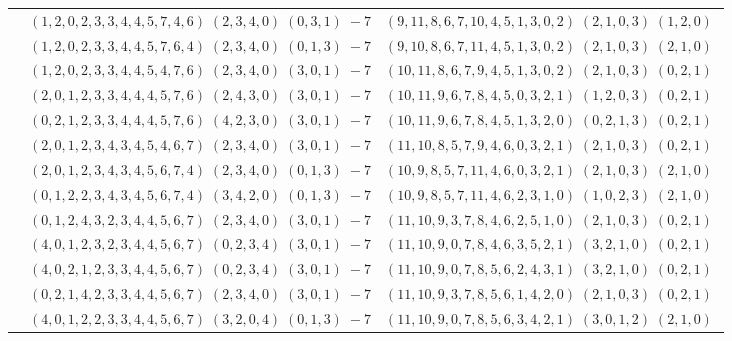\documentclass[11pt]{article}
\begin{document}
\begin{longtable}[l]{|c|c|c|}
 \cline{2-3} 
 & $(1 ,2 ,0 ,2 ,3 ,3 ,4 ,4 ,5 ,7 ,4 ,6) \;(2 ,3 ,4 ,0) \;(0 ,3 ,1) \;-7$ & $(9 ,11 ,8 ,6 ,7 ,10 ,4 ,5 ,1 ,3 ,0 ,2) \;(2 ,1 ,0 ,3) \;(1 ,2 ,0) \;$\\ 
 \cline{2-3} 
 & $(1 ,2 ,0 ,2 ,3 ,3 ,4 ,4 ,5 ,7 ,6 ,4) \;(2 ,3 ,4 ,0) \;(0 ,1 ,3) \;-7$ & $(9 ,10 ,8 ,6 ,7 ,11 ,4 ,5 ,1 ,3 ,0 ,2) \;(2 ,1 ,0 ,3) \;(2 ,1 ,0) \;$\\ 
 \cline{2-3} 
 & $(1 ,2 ,0 ,2 ,3 ,3 ,4 ,4 ,5 ,4 ,7 ,6) \;(2 ,3 ,4 ,0) \;(3 ,0 ,1) \;-7$ & $(10 ,11 ,8 ,6 ,7 ,9 ,4 ,5 ,1 ,3 ,0 ,2) \;(2 ,1 ,0 ,3) \;(0 ,2 ,1) \;$\\ 
 \cline{2-3} 
 & $(2 ,0 ,1 ,2 ,3 ,3 ,4 ,4 ,4 ,5 ,7 ,6) \;(2 ,4 ,3 ,0) \;(3 ,0 ,1) \;-7$ & $(10 ,11 ,9 ,6 ,7 ,8 ,4 ,5 ,0 ,3 ,2 ,1) \;(1 ,2 ,0 ,3) \;(0 ,2 ,1) \;$\\ 
 \cline{2-3} 
 & $(0 ,2 ,1 ,2 ,3 ,3 ,4 ,4 ,4 ,5 ,7 ,6) \;(4 ,2 ,3 ,0) \;(3 ,0 ,1) \;-7$ & $(10 ,11 ,9 ,6 ,7 ,8 ,4 ,5 ,1 ,3 ,2 ,0) \;(0 ,2 ,1 ,3) \;(0 ,2 ,1) \;$\\ 
 \cline{2-3} 
 & $(2 ,0 ,1 ,2 ,3 ,4 ,3 ,4 ,5 ,4 ,6 ,7) \;(2 ,3 ,4 ,0) \;(3 ,0 ,1) \;-7$ & $(11 ,10 ,8 ,5 ,7 ,9 ,4 ,6 ,0 ,3 ,2 ,1) \;(2 ,1 ,0 ,3) \;(0 ,2 ,1) \;$\\ 
 \cline{2-3} 
 & $(2 ,0 ,1 ,2 ,3 ,4 ,3 ,4 ,5 ,6 ,7 ,4) \;(2 ,3 ,4 ,0) \;(0 ,1 ,3) \;-7$ & $(10 ,9 ,8 ,5 ,7 ,11 ,4 ,6 ,0 ,3 ,2 ,1) \;(2 ,1 ,0 ,3) \;(2 ,1 ,0) \;$\\ 
 \cline{2-3} 
 & $(0 ,1 ,2 ,2 ,3 ,4 ,3 ,4 ,5 ,6 ,7 ,4) \;(3 ,4 ,2 ,0) \;(0 ,1 ,3) \;-7$ & $(10 ,9 ,8 ,5 ,7 ,11 ,4 ,6 ,2 ,3 ,1 ,0) \;(1 ,0 ,2 ,3) \;(2 ,1 ,0) \;$\\ 
 \cline{2-3} 
 & $(0 ,1 ,2 ,4 ,3 ,2 ,3 ,4 ,4 ,5 ,6 ,7) \;(2 ,3 ,4 ,0) \;(3 ,0 ,1) \;-7$ & $(11 ,10 ,9 ,3 ,7 ,8 ,4 ,6 ,2 ,5 ,1 ,0) \;(2 ,1 ,0 ,3) \;(0 ,2 ,1) \;$\\ 
 \cline{2-3} 
 & $(4 ,0 ,1 ,2 ,3 ,2 ,3 ,4 ,4 ,5 ,6 ,7) \;(0 ,2 ,3 ,4) \;(3 ,0 ,1) \;-7$ & $(11 ,10 ,9 ,0 ,7 ,8 ,4 ,6 ,3 ,5 ,2 ,1) \;(3 ,2 ,1 ,0) \;(0 ,2 ,1) \;$\\ 
 \cline{2-3} 
 & $(4 ,0 ,2 ,1 ,2 ,3 ,3 ,4 ,4 ,5 ,6 ,7) \;(0 ,2 ,3 ,4) \;(3 ,0 ,1) \;-7$ & $(11 ,10 ,9 ,0 ,7 ,8 ,5 ,6 ,2 ,4 ,3 ,1) \;(3 ,2 ,1 ,0) \;(0 ,2 ,1) \;$\\ 
 \cline{2-3} 
 & $(0 ,2 ,1 ,4 ,2 ,3 ,3 ,4 ,4 ,5 ,6 ,7) \;(2 ,3 ,4 ,0) \;(3 ,0 ,1) \;-7$ & $(11 ,10 ,9 ,3 ,7 ,8 ,5 ,6 ,1 ,4 ,2 ,0) \;(2 ,1 ,0 ,3) \;(0 ,2 ,1) \;$\\ 
 \cline{2-3} 
 & $(4 ,0 ,1 ,2 ,2 ,3 ,3 ,4 ,4 ,5 ,6 ,7) \;(3 ,2 ,0 ,4) \;(0 ,1 ,3) \;-7$ & $(11 ,10 ,9 ,0 ,7 ,8 ,5 ,6 ,3 ,4 ,2 ,1) \;(3 ,0 ,1 ,2) \;(2 ,1 ,0) \;$\\ 

\end{longtable}
\end{document}
